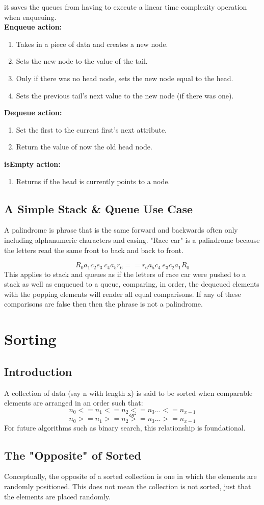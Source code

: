 \documentclass[letterpaper, 10pt]{article}
\begin{document}
it saves the queues from having to execute a linear time complexity operation when enqueuing.\\
\textbf{Enqueue action:}
\begin{enumerate}
    \item Takes in a piece of data and creates a new node.
    \item Sets the new node to the value of the tail.
    \item Only if there was no head node, sets the new node equal to the head.
    \item Sets the previous tail's next value to the new node (if there was one).
\end{enumerate}
\textbf{Dequeue action:}
\begin{enumerate}
    \item Set the first to the current first's next attribute.
    \item Return the value of now the old head node.
\end{enumerate}
\textbf{isEmpty action:}
\begin{enumerate}
    \item Returns if the head is currently points to a node.
\end{enumerate}
\subsection{A Simple Stack \& Queue Use Case}
A palindrome is phrase that is the same forward and backwards often only including
alphanumeric characters and casing.  "Race car" is a palindrome because the letters read the same
front to back and back to front.

\[R_0 a_1 c_2 e_3 \ c_4 a_5 r_6 == r_6 a_5 c_4 \ e_3 c_2 a_1 R_0\]
\noindent
This applies to stack and queues as if the letters of race car were pushed to a stack
as well as enqueued to a queue, comparing, in order, the dequeued elements with the popping elements
will render all equal comparisons. If any of these comparisons are false then then the phrase is not
a palindrome.

\section{Sorting}
\subsection{Introduction}
A collection of data (say n with length x) is said to be sorted when comparable elements are arranged in an order
such that:
\[n_0 <= n_1 <= n_2 <= n_3 \dots <= n_{x-1} \]
\[or\]
\[n_0 >= n_1 >= n_2 >= n_3 \dots >= n_{x-1}\]
For future algorithms such as binary search, this relationship is foundational.
\subsection{The "Opposite" of Sorted}
Conceptually, the opposite of a sorted collection is one in which the elements are
randomly positioned. This does not mean the collection is not sorted, just that the elements
are placed randomly. 



\vspace{2em}

\end{document}
